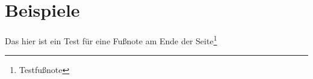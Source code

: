 \section{Beispiele}\label{sec:beispiele}

Das hier ist ein Test für eine Fußnote am Ende der Seite\footnote{Testfußnote}















